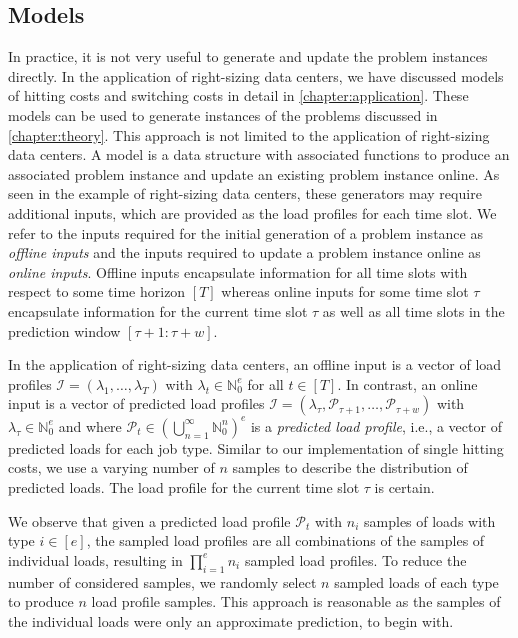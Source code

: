 \subsection{Models}

In practice, it is not very useful to generate and update the problem instances directly. In the application of right-sizing data centers, we have discussed models of hitting costs and switching costs in detail in \cref{chapter:application}. These models can be used to generate instances of the problems discussed in \cref{chapter:theory}. This approach is not limited to the application of right-sizing data centers. A model is a data structure with associated functions to produce an associated problem instance and update an existing problem instance online. As seen in the example of right-sizing data centers, these generators may require additional inputs, which are provided as the load profiles for each time slot. We refer to the inputs required for the initial generation of a problem instance as \emph{offline inputs} and the inputs required to update a problem instance online as \emph{online inputs}. Offline inputs encapsulate information for all time slots with respect to some time horizon $[T]$ whereas online inputs for some time slot $\tau$ encapsulate information for the current time slot $\tau$ as well as all time slots in the prediction window $[\tau + 1 : \tau + w]$.

In the application of right-sizing data centers, an offline input is a vector of load profiles $\mathcal{I} = (\lambda_1, \dots, \lambda_T)$ with $\lambda_t \in \mathbb{N}_0^e$ for all $t \in [T]$. In contrast, an online input is a vector of predicted load profiles $\mathcal{I} = (\lambda_{\tau}, \mathcal{P}_{\tau + 1}, \dots, \mathcal{P}_{\tau + w})$ with $\lambda_{\tau} \in \mathbb{N}_0^e$ and where $\mathcal{P}_t \in \left(\bigcup_{n=1}^{\infty} \mathbb{N}_0^n\right)^e$ is a \emph{predicted load profile}, i.e., a vector of predicted loads for each job type. Similar to our implementation of single hitting costs, we use a varying number of $n$ samples to describe the distribution of predicted loads. The load profile for the current time slot $\tau$ is certain.

We observe that given a predicted load profile $\mathcal{P}_t$ with $n_i$ samples of loads with type $i \in [e]$, the sampled load profiles are all combinations of the samples of individual loads, resulting in $\prod_{i=1}^e n_i$ sampled load profiles. To reduce the number of considered samples, we randomly select $n$ sampled loads of each type to produce $n$ load profile samples. This approach is reasonable as the samples of the individual loads were only an approximate prediction, to begin with.

